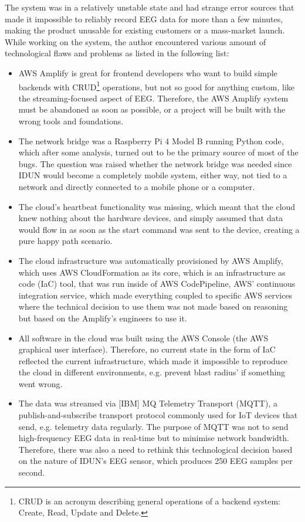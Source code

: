 The system was in a relatively unstable state and had strange error sources that made it impossible to reliably record EEG data for more than a few minutes, making the product unusable for existing customers or a mass-market launch. While working on the system, the author encountered various amount of technological flaws and problems as listed in the following list:

\begin{itemize}

\item AWS Amplify is great for frontend developers who want to build simple backends with CRUD\footnote{CRUD is an acronym describing general operations of a backend system: Create, Read, Update and Delete.} operations, but not so good for anything custom, like the streaming-focused aspect of EEG. Therefore, the AWS Amplify system must be abandoned as soon as possible, or a project will be built with the wrong tools and foundations.
\item The network bridge was a Raspberry Pi 4 Model B running Python code, which after some analysis, turned out to be the primary source of most of the bugs. The question was raised whether the network bridge was needed since IDUN would become a completely mobile system, either way, not tied to a network and directly connected to a mobile phone or a computer.
\item The cloud's heartbeat functionality was missing, which meant that the cloud knew nothing about the hardware devices, and simply assumed that data would flow in as soon as the start command was sent to the device, creating a pure happy path scenario.
\item The cloud infrastructure was automatically provisioned by AWS Amplify, which uses AWS CloudFormation as its core, which is an infrastructure as code (IaC) tool, that was run inside of AWS CodePipeline, AWS' continuous integration service, which made everything coupled to specific AWS services where the technical decision to use them was not made based on reasoning but based on the Amplify's engineers to use it.
\item All software in the cloud was built using the AWS Console (the AWS graphical user interface). Therefore, no current state in the form of IaC reflected the current infrastructure, which made it impossible to reproduce the cloud in different environments, e.g. prevent blast radius' if something went wrong.
\item The data was streamed via [IBM] MQ Telemetry Transport (MQTT), a publish-and-subscribe transport protocol commonly used for IoT devices that send, e.g. telemetry data regularly. The purpose of MQTT was not to send high-frequency EEG data in real-time but to minimise network bandwidth. Therefore, there was also a need to rethink this technological decision based on the nature of IDUN's EEG sensor, which produces 250 EEG samples per second.

\end{itemize}
